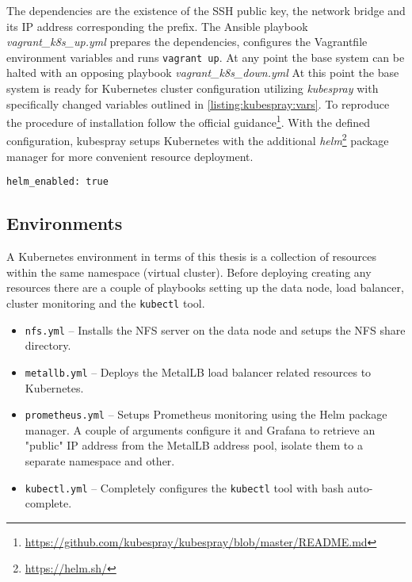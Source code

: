 The dependencies are the existence of the SSH public key, the network bridge and its IP address corresponding the prefix. The Ansible playbook \textit{vagrant\_k8s\_up.yml} prepares the dependencies, configures the Vagrantfile environment variables and runs \texttt{vagrant up}. At any point the base system can be halted with an opposing playbook \textit{vagrant\_k8s\_down.yml} At this point the base system is ready for Kubernetes cluster configuration utilizing \textit{kubespray} with specifically changed variables outlined in \autoref{listing:kubespray:vars}. To reproduce the procedure of installation follow the official guidance\footnote{\url{https://github.com/kubespray/kubespray/blob/master/README.md}}. With the defined configuration, kubespray setups Kubernetes with the additional \textit{helm}\footnote{\url{https://helm.sh/}} package manager for more convenient resource deployment.

\begin{lstlisting}[language=Clean, style=custom, caption={Changed variables in the created inventory. In addition to the the hosts defined in \textit{hosts.yaml} file, kubespray defaults with two master nodes for the setup of three nodes in total - this is changed to one master node.}, label=listing:kubespray:vars]
helm_enabled: true
\end{lstlisting}

\subsection{Environments \label{implementation:k8s:envs}}
A Kubernetes environment in terms of this thesis is a collection of resources within the same namespace (virtual cluster). Before deploying creating any resources there are a couple of playbooks setting up the data node, load balancer, cluster monitoring and the \texttt{kubectl} tool.

\begin{itemize}[noitemsep]
	\item \texttt{nfs.yml} -- Installs the NFS server on the data node and setups the NFS share directory.
	\item \texttt{metallb.yml} -- Deploys the MetalLB load balancer related resources to Kubernetes.
	\item \texttt{prometheus.yml} -- Setups Prometheus monitoring using the Helm package manager. A couple of arguments configure it and Grafana to retrieve an "public" IP address from the MetalLB address pool, isolate them to a separate namespace and other.
	\item \texttt{kubectl.yml} -- Completely configures the \texttt{kubectl} tool with bash auto-complete.
\end{itemize}

